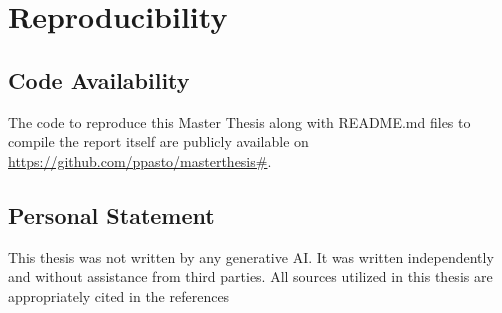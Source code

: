





\chapter{Reproducibility} \label{appndx}
% 
% 
%  
% 
% 
\section{Code Availability}

The code to reproduce this Master Thesis along with README.md files to compile the report itself are publicly available on \url{https://github.com/ppasto/masterthesis#}. 



\section{Personal Statement}

This thesis was not written by any generative AI. It was written independently and
without assistance from third parties. All sources utilized in this thesis are appropriately cited in the references

